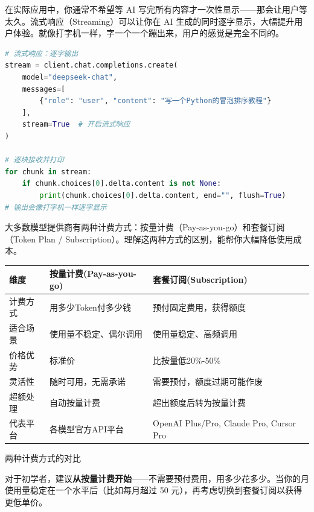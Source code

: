 
在实际应用中，你通常不希望等 AI 写完所有内容才一次性显示——那会让用户等太久。流式响应（Streaming）可以让你在 AI 生成的同时逐字显示，大幅提升用户体验。就像打字机一样，字一个一个蹦出来，用户的感觉是完全不同的。

\begin{lstlisting}[language=Python]
# 流式响应：逐字输出
stream = client.chat.completions.create(
    model="deepseek-chat",
    messages=[
        {"role": "user", "content": "写一个Python的冒泡排序教程"}
    ],
    stream=True  # 开启流式响应
)

# 逐块接收并打印
for chunk in stream:
    if chunk.choices[0].delta.content is not None:
        print(chunk.choices[0].delta.content, end="", flush=True)
# 输出会像打字机一样逐字显示
\end{lstlisting}


大多数模型提供商有两种计费方式：按量计费（Pay-as-you-go）和套餐订阅（Token Plan / Subscription）。理解这两种方式的区别，能帮你大幅降低使用成本。


\begin{center}
\begin{tabularx}{\linewidth}{|X|X|X|}
\hline
\textbf{维度} & \textbf{按量计费(Pay-as-you-go)} & \textbf{套餐订阅(Subscription)} \tabularnewline
\hline
计费方式 & 用多少Token付多少钱 & 预付固定费用，获得额度 \tabularnewline
适合场景 & 使用量不稳定、偶尔调用 & 使用量稳定、高频调用 \tabularnewline
价格优势 & 标准价 & 比按量低20\%-50\% \tabularnewline
灵活性 & 随时可用，无需承诺 & 需要预付，额度过期可能作废 \tabularnewline
超额处理 & 自动按量计费 & 超出额度后转为按量计费 \tabularnewline
代表平台 & 各模型官方API平台 & OpenAI Plus/Pro, Claude Pro, Cursor Pro \tabularnewline
\hline
\end{tabularx}
\end{center}

\begin{center}\small\color{gray}两种计费方式的对比\end{center}

对于初学者，建议\textbf{从按量计费开始}——不需要预付费用，用多少花多少。当你的月使用量稳定在一个水平后（比如每月超过 50 元），再考虑切换到套餐订阅以获得更低单价。


